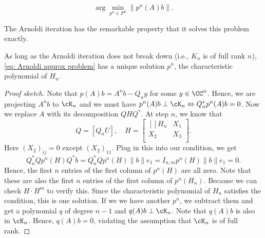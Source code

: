 \begin{example}
\label{eg: Arnoldi/Lanczos Approximation Problem}
\begin{equation}
\label{eq: Arnoldi approx problem}
        \arg\min_{p^{n}\in P^{n}}  \|p^{n}(A)b\|. 
\end{equation}
\end{example}

The Arnoldi iteration has the remarkable property that it solves this problem exactly. 


\begin{theorem}
\label{thm: prop of Arnoldi iteration}
As long as the Arnoldi iteration does not break down (i.e., $ K_n $ is of full rank $ n $), \eqref{eq: Arnoldi approx problem} has a unique solution $ p^{n} $, the characteristic polynomial of $ H_n $.  
\end{theorem}
\begin{proof}[Proof sketch]
Note that $ p(A)b = A^{n}b - Q_n y$ for some $ y \in \CC^n $.  Hence, we are projecting $ A^{n}b $ to $ \cK_n $ and we must have $ p^n(A)b\perp \cK_n \Leftrightarrow Q_n^*  p^{n}(A)b= 0 $. Now we replace $ A $ with its decomposition $ QHQ^*  $. At step $ n $, we know that 
\[
    Q = [Q_{n} U], \quad H = \begin{bmatrix}[] 
        H_n &  X_1 \\
        X_2 &  X_3 \\
    \end{bmatrix}. 
\]
Here $ (X_2)_{ij} = 0$ except $ (X_2)_{11} $.  Plug in this into our condition, we get 
\[
    Q_n^*  Q p^{n}(H) Q^*  b = Q_n^* Q p^n (H) \|b\|e_1 = I_{n,m} p^{n}(H)\|b\|e_1 = 0. 
\]
Hence, the first $ n $ entries of the first column of $ p^n(H) $ are all zero. Note that these are also the first $ n $ entries of the first column of $ p^n(H_n) $. Because we can check $ H\cdot H^m $ to verify this. Since the characteristic polynomial of $ H_n $ satisfies the condition, this is one solution. If we we have another $ p^{n} $, we subtract them and get a polynomial $ q $ of degree $ n-1 $ and $q(A)b\perp \cK_n$. Note that $ q(A)b $ is also in $ \cK_n $. Hence, $ q(A)b = 0 $, violating the assumption that $ \cK_n $ is of full rank. 

\end{proof}

